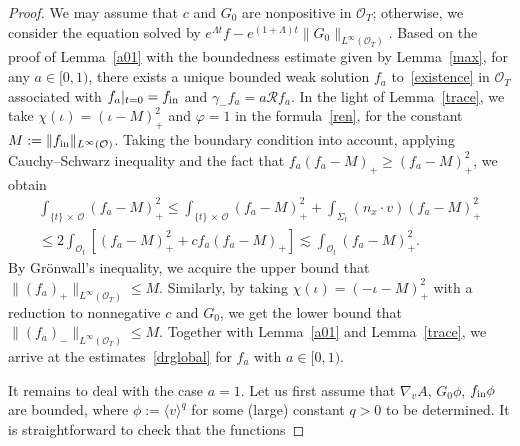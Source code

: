 \documentclass[10pt]{amsart}
\theoremstyle{definition}\newtheorem{defi}[theo]{Definition}\newtheorem{rema}[theo]{Remark}\newtheorem{exam}[theo]{Example}\newtheorem{exem}[theo]{Example}\newtheorem{nota}[theo]{Notation}
\newcommand*\fin {f_{\rm in}}
\newcommand*\RR {\mathcal{R}}
\newcommand*\OO {\mathcal{O}}
\newcommand{\la}{\langle}
\newcommand{\ra}{\rangle}
\begin{document}
\begin{proof}
We may assume that $c$ and $G_0$ are nonpositive in $\OO_T$; otherwise, we consider the equation solved by $e^{\Lambda t}f-e^{(1+\Lambda)t}\|G_0\|_{L^\infty(\OO_T)}$. Based on the proof of Lemma~\ref{a01} with the boundedness estimate given by Lemma~\ref{max}, for any $a\in[0,1)$, there exists a unique bounded weak solution $f_a$ to~\eqref{existence} in $\OO_T$ associated with $f_a|_{t=0}=\fin$ and $\gamma_-f_a=a\RR f_a$. In the light of Lemma~\ref{trace}, we take $\chi(\iota)=(\iota-M)_+^2$ and $\varphi=1$ in the formula~\eqref{ren}, for the constant $M:=\|\fin\|_{L^\infty(\OO)}$. Taking the boundary condition into account, applying Cauchy--Schwarz inequality and the fact that $f_a(f_a-M)_+\ge (f_a-M)_+^2$, we obtain
\begin{multline*}
\int_{\{t\}\,\times\,\OO} \left(f_a-M\right)_+^2
\le\int_{\{t\}\,\times\,\OO} \left(f_a-M\right)_+^2 + \int_{\Sigma_t}(n_x\cdot v)\left(f_a-M\right)_+^2\\
\le 2\int_{\OO_t} \left[\left(f_a-M\right)_+^2 + cf_a
\left(f_a-M\right)_+ \right]
\lesssim \int_{\OO_t} \left(f_a-M\right)_+^2.
\end{multline*}
By Gr\"onwall's inequality, we acquire the upper bound that $\|(f_a)_+\|_{L^\infty(\OO_T)}\le M$. Similarly, by taking $\chi(\iota)=(-\iota-M)_+^2$ with a reduction to nonnegative $c$ and $G_0$, we get the lower bound that $\|(f_a)_-\|_{L^\infty(\OO_T)}\le M$. Together with Lemma~\ref{a01} and Lemma~\ref{trace}, we arrive at the estimates~\eqref{drglobal} for $f_a$ with $a\in[0,1)$.

It remains to deal with the case $a=1$. Let us first assume that $\nabla_vA$, $G_0\phi$, $\fin\phi$ are bounded, where $\phi:=\la v\ra^q$ for some (large) constant $q>0$ to be determined. It is straightforward to check that the functions


\end{proof}
\end{document}
